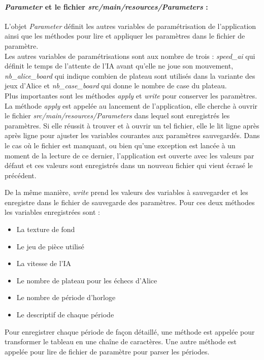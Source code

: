 \documentclass[a4paper]{article}
\begin{document}
\paragraph{\textit{Parameter} et le fichier \textit{src/main/resources/Parameters} :}L'objet \textit{Parameter} définit les autres variables de paramétrisation de l'application ainsi que les méthodes pour lire et appliquer les paramètres dans le fichier de paramètre. \\

Les autres variables de paramétrisations sont aux nombre de trois : \textit{speed\_ai} qui définit le temps de l'attente de l'IA avant qu'elle ne joue son mouvement, \textit{nb\_alice\_board} qui indique combien de plateau sont utilisés dans la variante des jeux d'Alice et \textit{nb\_case\_board} qui donne le nombre de case du plateau. \\

Plus importantes sont les méthodes \textit{apply} et \textit{write} pour conserver les paramètres. La méthode \textit{apply} est appelée au lancement de l'application, elle cherche à ouvrir le fichier \textit{src/main/resources/Parameters} dans lequel sont enregistrés les paramètres. Si elle réussit à trouver et à ouvrir un tel fichier, elle le lit ligne après après ligne pour ajuster les variables courantes aux paramètres sauvegardés. Dans le cas où le fichier est manquant, ou bien qu'une exception est lancée à un moment de la lecture de ce dernier, l'application est ouverte avec les valeurs par défaut et ces valeurs sont enregistrés dans un nouveau fichier qui vient écrasé le précédent. 

De la même manière, \textit{write} prend les valeurs des variables à sauvegarder et les enregistre dans le fichier de sauvegarde des paramètres. Pour ces deux méthodes les variables enregistrées sont : 
\begin{itemize}
\item La texture de fond
\item Le jeu de pièce utilisé
\item La vitesse de l'IA
\item Le nombre de plateau pour les échecs d'Alice
\item Le nombre de période d'horloge
\item Le descriptif de chaque période
\end{itemize}

Pour enregistrer chaque période de façon détaillé, une méthode est appelée pour transformer le tableau en une chaîne de caractères. Une autre méthode est appelée pour lire de fichier de paramètre pour parser les périodes. 
\end{document}
